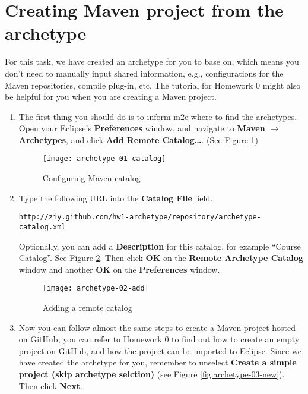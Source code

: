 
\section{Creating Maven project from the archetype}

For this task, we have created an archetype for you to base on, which means you
don't need to manually input shared information, e.g., configurations for the
Maven repositories, compile plug-in, etc. The tutorial for Homework 0 might also
be helpful for you when you are creating a Maven project.

\begin{enumerate}

\item The first thing you should do is to inform m2e where to find the
archetypes. Open your Eclipse's \textbf{Preferences} window, and navigate to
\textbf{Maven} $\rightarrow$ \textbf{Archetypes}, and click \textbf{Add Remote
Catalog\ldots}. (See Figure \ref{fig:archetype-01-catalog})

\begin{figure}[t]
\centering
\texttt{[image: archetype-01-catalog]}
\caption{Configuring Maven catalog\label{fig:archetype-01-catalog}}
\end{figure}

\item Type the following URL into the \textbf{Catalog File} field.

\begin{verbatim}
http://ziy.github.com/hw1-archetype/repository/archetype-catalog.xml
\end{verbatim}

Optionally, you can add a \textbf{Description} for this catalog, for example
``Course Catalog''. See Figure \ref{fig:archetype-02-add}. Then click
\textbf{OK} on the \textbf{Remote Archetype Catalog} window and another
\textbf{OK} on the \textbf{Preferences} window.

\begin{figure}[t]
\centering
\texttt{[image: archetype-02-add]}
\caption{Adding a remote catalog\label{fig:archetype-02-add}}
\end{figure}

\item Now you can follow almost the same steps to create a Maven project hosted
on GitHub, you can refer to Homework 0 to find out how to create an empty
project on GitHub, and how the project can be imported to Eclipse. Since we have
created the archetype for you, remember to unselect \textbf{Create a simple
project (skip archetype selction)} (see Figure \ref{fig:archetype-03-new}). Then
click \textbf{Next}.
 

\end{enumerate}
